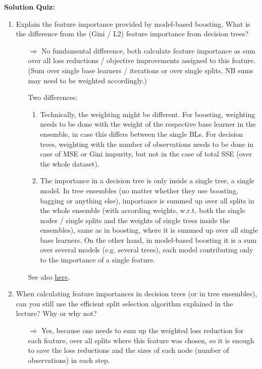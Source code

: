 \textbf{Solution Quiz:}\\\noindent
\medskip

\begin{enumerate}
    \item Explain the feature importance provided by model-based boosting. What is the difference from the (Gini / L2) feature importance from decision trees?
    \begin{itemize}
        \item[$\Rightarrow$]
        No fundamental difference, both calculate feature importance as sum over all loss reductions / objective improvements assigned to this feature. (Sum over single base learners / iterations or over single splits, NB sums may need to be weighted accordingly.)
        
        Two differences:
        \begin{enumerate}
            \item Technically, the weighting might be different.
            For boosting, weighting needs to be done with the weight of the respective base learner in the ensemble, in case this differs between the single BLs.
            For decision trees, weighting with the number of observations needs to be done in case of MSE or Gini impurity, but not in the case of total SSE (over the whole dataset).
            \item The importance in a decision tree is only inside a single tree, a single model.
            In tree ensembles (no matter whether they use boosting, bagging or anything else), importance is summed up over all splits in the whole ensemble (with according weights, w.r.t. both the single nodes / single splits and the weights of single trees inside the ensembles), same as in boosting, where it is summed up over all single base learners.
            On the other hand, in model-based boosting it is a sum over several models (e.g. several trees), each model contributing only to the importance of a single feature.
        \end{enumerate}

        See also \href{https://stackoverflow.com/questions/49170296/scikit-learn-feature-importance-calculation-in-decision-trees}{here}.
    \end{itemize}

    \item When calculating feature importances in decision trees (or in tree ensembles), can you still use the efficient split selection algorithm explained in the lecture? Why or why not?
    \begin{itemize}
        \item[$\Rightarrow$]
        Yes, because one needs to sum up the weighted loss reduction for each feature, over all splits where this feature was chosen, so it is enough to save the loss reductions and the sizes of each node (number of observations) in each step.
    \end{itemize}


\end{enumerate}
